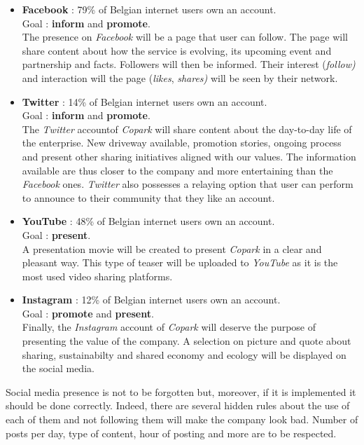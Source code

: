 \documentclass[12pt,a4paper,oneside]{book}
\newcommand{\bp}{\textit{Copark }}
\begin{document}
\begin{itemize}
\item \textbf{Facebook} : 79\% of Belgian internet users own an account.\\Goal : \textbf{inform} and \textbf{promote}.\\
The presence on \textit{Facebook} will be a page that user can follow. The page will share content about how the service is evolving, its upcoming event and partnership and facts. Followers will then be informed. Their interest (\textit{follow)} and interaction will the page (\textit{likes}, \textit{shares)} will be seen by their network. 
\item \textbf{Twitter} : 14\% of Belgian internet users own an account.\\Goal : \textbf{inform} and \textbf{promote}.\\
The \textit{Twitter} accountof \bp will share content about the day-to-day life of the enterprise. New driveway available, promotion stories, ongoing process and present other sharing initiatives aligned with our values. The information available are thus closer to the company and more entertaining than the \textit{Facebook} ones. \textit{Twitter} also possesses a relaying option that user can perform to announce to their community that they like an account.
\item \textbf{YouTube} : 48\% of Belgian internet users own an account.\\Goal : \textbf{present}.\\
A presentation movie will be created to present \bp in a clear and pleasant way. This type of teaser will be uploaded to \textit{YouTube} as it is the most used video sharing platforms.
\item \textbf{Instagram} : 12\% of Belgian internet users own an account.\\Goal : \textbf{promote} and \textbf{present}.\\
Finally, the \textit{Instagram} account of \bp will deserve the purpose of presenting the value of the company. A selection on picture and quote about sharing, sustainabilty and shared economy and ecology will be displayed on the social media.
\end{itemize}

Social media presence is not to be forgotten but, moreover, if it is implemented it should be done correctly. Indeed, there are several hidden rules about the use of each of them and not following them will make the company look bad. Number of posts per day, type of content, hour of posting and more are to be respected.\cite{smrules}
\end{document}
